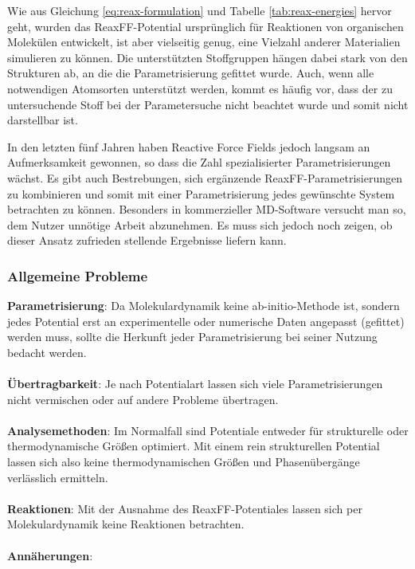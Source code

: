 Wie aus Gleichung \ref{eq:reax-formulation} und Tabelle \ref{tab:reax-energies} hervor geht, wurden das ReaxFF-Potential ursprünglich für Reaktionen von organischen Molekülen entwickelt, ist aber vielseitig genug, eine Vielzahl anderer Materialien simulieren zu können.
Die unterstützten Stoffgruppen hängen dabei stark von den Strukturen ab, an die die Parametrisierung gefittet wurde.
Auch, wenn alle notwendigen Atomsorten unterstützt werden, kommt es häufig vor, dass der zu untersuchende Stoff bei der Parametersuche nicht beachtet wurde und somit nicht darstellbar ist.

In den letzten fünf Jahren haben Reactive Force Fields jedoch langsam an Aufmerksamkeit gewonnen, so dass die Zahl spezialisierter Parametrisierungen wächst.
Es gibt auch Bestrebungen, sich ergänzende ReaxFF-Parametrisierungen zu kombinieren und somit mit einer Parametrisierung jedes gewünschte System betrachten zu können.
Besonders in kommerzieller MD-Software versucht man so, dem Nutzer unnötige Arbeit abzunehmen.
Es muss sich jedoch noch zeigen, ob dieser Ansatz zufrieden stellende Ergebnisse liefern kann.

\subsubsection{Allgemeine Probleme}

\textbf{Parametrisierung}:
Da Molekulardynamik keine ab-initio-Methode ist, sondern jedes Potential erst an experimentelle oder numerische Daten angepasst (gefittet) werden muss, sollte die Herkunft jeder Parametrisierung bei seiner Nutzung bedacht werden.
\\\\
\textbf{Übertragbarkeit}:
Je nach Potentialart lassen sich viele Parametrisierungen nicht vermischen oder auf andere Probleme übertragen.
\\\\
\textbf{Analysemethoden}:
Im Normalfall sind Potentiale entweder für strukturelle oder thermodynamische Größen optimiert.
Mit einem rein strukturellen Potential lassen sich also keine thermodynamischen Größen und Phasenübergänge verlässlich ermitteln.
\\\\
\textbf{Reaktionen}:
Mit der Ausnahme des ReaxFF-Potentiales lassen sich per Molekulardynamik keine Reaktionen betrachten.
\\\\
\textbf{Annäherungen}:

